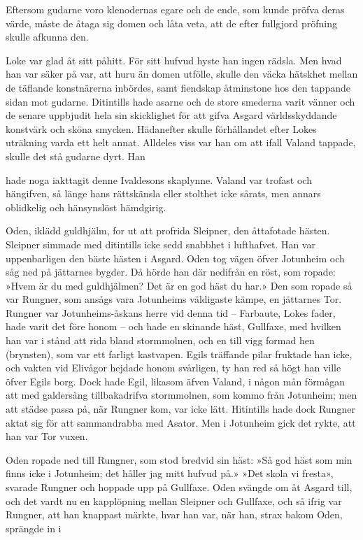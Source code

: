 Eftersom gudarne voro klenodernas egare och de ende, som kunde pröfva
deras värde, måste de åtaga sig domen och låta veta, att de efter
fullgjord pröfning skulle afkunna den.

Loke var glad åt sitt påhitt. För sitt hufvud hyste han ingen rädsla.
Men hvad han var säker på var, att huru än domen utfölle, skulle den
väcka hätskhet mellan de täflande konstnärerna inbördes, samt fiendskap
åtminstone hos den tappande sidan mot gudarne. Ditintills hade asarne
och de store smederna varit vänner och de senare uppbjudit hela sin
skicklighet för att gifva Asgard världsskyddande konstvärk och sköna
smycken. Hädanefter skulle förhållandet efter Lokes uträkning varda ett
helt annat. Alldeles viss var han om att ifall Valand tappade, skulle
det stå gudarne dyrt. Han

hade noga iakttagit denne Ivaldesons skaplynne. Valand var trofast och
hängifven, så länge hans rättskänsla eller stolthet icke sårats, men
annars oblidkelig och hänsynslöst hämdgirig.



Oden, iklädd guldhjälm, for ut att profrida Sleipner, den åttafotade
hästen. Sleipner simmade med ditintills icke sedd snabbhet i lufthafvet.
Han var uppenbarligen den bäste hästen i Asgard. Oden tog vägen öfver
Jotunheim och såg ned på jättarnes bygder. Då hörde han där nedifrån en
röst, som ropade: »Hvem är du med guldhjälmen? Det är en god häst du
har.» Den som ropade så var Rungner, som ansågs vara Jotunheims
väldigaste kämpe, en jättarnes Tor. Rungner var Jotunheims-åskans herre
vid denna tid -- Farbaute, Lokes fader, hade varit det före honom -- och
hade en skinande häst, Gullfaxe, med hvilken han var i stånd att rida
bland stormmolnen, och en till vigg formad hen (brynsten), som var ett
farligt kastvapen. Egils träffande pilar fruktade han icke, och vakten
vid Elivågor hejdade honom svårligen, ty han red så högt han ville öfver
Egils borg. Dock hade Egil, likasom äfven Valand, i någon mån förmågan
att med galdersång tillbakadrifva stormmolnen, som kommo från Jotunheim;
men att städse passa på, när Rungner kom, var icke lätt. Hitintills hade
dock Rungner aktat sig för att sammandrabba med Asator. Men i Jotunheim
gick det rykte, att han var Tor vuxen.

Oden ropade ned till Rungner, som stod bredvid sin häst: »Så god häst
som min finns icke i Jotunheim; det håller jag mitt hufvud på.» »Det
skola vi fresta», svarade Rungner och hoppade upp på Gullfaxe. Oden
svängde om åt Asgard till, och det vardt nu en kapplöpning mellan
Sleipner och Gullfaxe, och så ifrig var Rungner, att han knappast
märkte, hvar han var, när han, strax bakom Oden, sprängde in i

